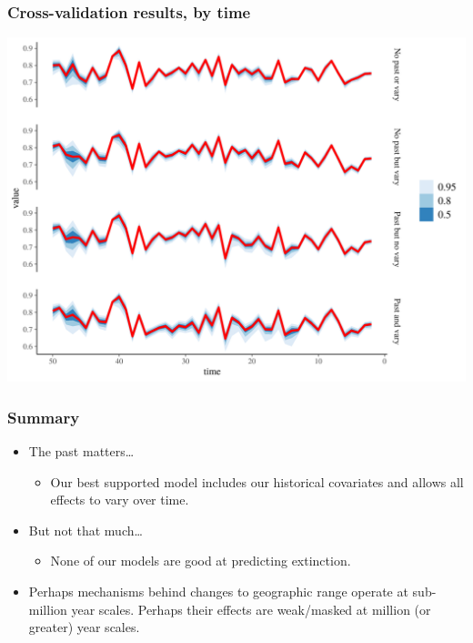 \documentclass{beamer}
\begin{document}
\begin{frame}
  \frametitle{Cross-validation results, by time}

  \includegraphics[width=\textwidth,height=0.8\textheight,keepaspectratio=true]{../results/figure/fold_auc_time}

\end{frame}


\begin{frame}
  \frametitle{Summary}

  \begin{itemize}
    \item \alert{The past matters\dots} 
      \begin{itemize}
        \item Our best supported model includes our historical covariates and allows all effects to vary over time.
      \end{itemize}
    \item \alert{But not that much\dots}
      \begin{itemize}
        \item None of our models are good at predicting extinction.
      \end{itemize}
    \item Perhaps mechanisms behind changes to geographic range operate at sub-million year scales. Perhaps their effects are weak/masked at million (or greater) year scales.
  \end{itemize}

\end{frame}
\end{document}
